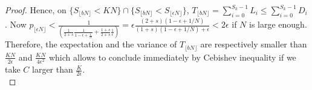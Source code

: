 \documentclass[11pt]{article}
\theoremstyle{remark}
\numberwithin{equation}{section}
\begin{document}
\begin{proof}
Hence, on $\{S_{\lfloor bN\rfloor}<KN\}\cap\{S_{\lfloor bN\rfloor}<S_{\lfloor \epsilon N\rfloor} \}$, 
$T_{\lfloor bN\rfloor}=\sum_{i=0}^{S_k-1}L_i\leq\sum_{i=0}^{S_k-1}D_i$. Now $p_{\lfloor \epsilon N\rfloor}<\frac{1}{\left(\frac{1}{2+s}\frac{1}{1-\epsilon+\frac{1}{N}}+\frac{1+s}{2+s}\frac{1}{\epsilon}\right)}=\epsilon\frac{(2+s)(1-\epsilon+1/N)}{(1+s)(1-\epsilon+1/N)+\epsilon}<2\epsilon$ if $N$ is large enough. Therefore, the expectation and the variance of $T_{\lfloor bN\rfloor}$ are respectively smaller than $\frac{KN}{2\epsilon}$ and $\frac{KN}{4\epsilon^2}$ which allows to conclude immediately by Cebishev inequality if we take $C$ larger than $\frac{K}{2\epsilon}$.\\


\end{proof}
\end{document}

